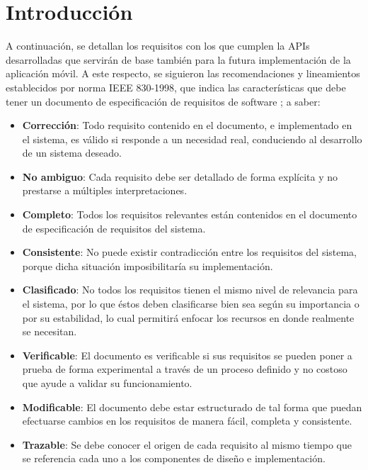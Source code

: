 
\section{Introducción}
A continuación, se detallan los requisitos con los que cumplen la APIs desarrolladas que servirán de base también para la futura implementación de la aplicación móvil.
A este respecto, se siguieron las recomendaciones y lineamientos establecidos por norma IEEE 830-1998, que indica las características que debe tener un documento de especificación de requisitos de software \cite{ieee_830_1998_recommended}; a saber:

\begin{itemize}
\tightlist
\item
  \textbf{Corrección}: Todo requisito contenido en el documento, e implementado en el sistema, es válido si responde a un necesidad real, conduciendo al desarrollo de un sistema deseado.\\
\item
  \textbf{No ambiguo}: Cada requisito debe ser detallado de forma explícita y no prestarse a múltiples interpretaciones. \\
\item
  \textbf{Completo}: Todos los requisitos relevantes están contenidos en el documento de especificación de requisitos del sistema. \\
\item
  \textbf{Consistente}: No puede existir contradicción entre los requisitos del sistema, porque dicha situación imposibilitaría su implementación. \\
\item
  \textbf{Clasificado}: No todos los requisitos tienen el mismo nivel de relevancia para el sistema, por lo que éstos deben clasificarse bien sea según su importancia o por su estabilidad, lo cual permitirá enfocar los recursos en donde realmente se necesitan. \\
\item
  \textbf{Verificable}: El documento es verificable si sus requisitos se pueden poner a prueba de forma experimental a través de un proceso definido y no costoso que ayude a validar su funcionamiento. \\
\item
  \textbf{Modificable}: El documento debe estar estructurado de tal forma que puedan efectuarse cambios en los requisitos de manera fácil, completa y consistente. \\
\item
  \textbf{Trazable}: Se debe conocer el origen de cada requisito al mismo tiempo que se referencia cada uno a los componentes de diseño e implementación. \\
\end{itemize}

